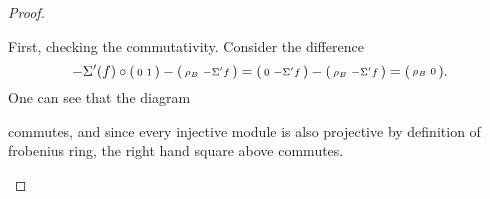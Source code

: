 \begin{proof}
\begin{enumerate}[label={(\bfseries TR\arabic*)}]
{            First, checking the commutativity. Consider the difference
            \[
                -\Sigma'(f) \circ
                \begin{psmallmatrix}
                    0 & 1
                \end{psmallmatrix}
                -
                \begin{psmallmatrix}
                    \rho_B & -\Sigma' f
                \end{psmallmatrix}
                =
                \begin{psmallmatrix}
                    0 & -\Sigma' f
                \end{psmallmatrix}
                -
                \begin{psmallmatrix}
                    \rho_B & -\Sigma' f
                \end{psmallmatrix}
                = 
                \begin{psmallmatrix}
                    \rho_B & 0
                \end{psmallmatrix}.
            \]
            One can see that the diagram
            \begin{center}
            \end{center}
            commutes, and since every injective module is also projective by definition of frobenius ring, the right hand square above commutes.

}
\end{enumerate}
\end{proof}

